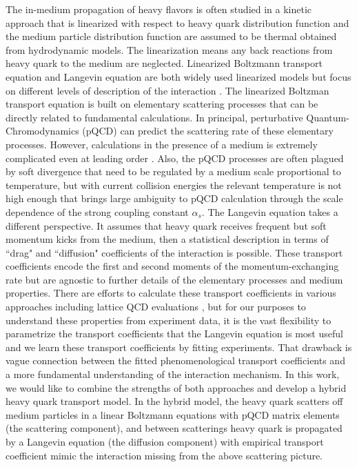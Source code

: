 \documentclass[aps, prc, reprint, amsmath, groupedaddress, nofootinbib]{revtex4-1}
\begin{document}
The in-medium propagation of heavy flavors is often studied in a kinetic approach that is linearized with respect to heavy quark distribution function and the medium particle distribution function are assumed to be thermal obtained from hydrodynamic models.
The linearization means any back reactions from heavy quark to the medium are neglected.
Linearized Boltzmann transport equation and Langevin equation are both widely used linearized models but focus on different levels of description of the interaction \cite{Auvinen:2009qm,Cao:2016gvr, Cao:2017hhk, PhysRevD.37.2484, Moore:2004tg}.
The linearized Boltzman transport equation is built on elementary scattering processes that can be directly related to fundamental calculations.
In principal, perturbative Quantum-Chromodynamics (pQCD) can predict the scattering rate of these elementary processes.
However, calculations in the presence of a medium is extremely complicated even at leading order \cite{Arnold:2002zm}.
Also, the pQCD processes are often plagued by soft divergence that need to be regulated by a medium scale proportional to temperature, but with current collision energies the relevant temperature is not high enough that brings large ambiguity to pQCD calculation through the scale dependence of the strong coupling constant $\alpha_s$.
The Langevin equation takes a different perspective. 
It assumes that heavy quark receives frequent but soft momentum kicks from the medium, then a statistical description in terms of ``drag" and ``diffusion" coefficients of the interaction is possible.
These transport coefficients encode the first and second moments of the momentum-exchanging rate but are agnostic to further details of the elementary processes and medium properties.
There are efforts to calculate these transport coefficients in various approaches including lattice QCD evaluations \cite{Moore:2004tg, Gossiaux:2008jv,He:2012df,Riek:2010fk,Ding:2012sp,Banerjee:2011ra}, but for our purposes to understand these properties from experiment data, it is the vast flexibility to parametrize the transport coefficients that the Langevin equation is most useful and we learn these transport coefficients by fitting experiments.
That drawback is vague connection between the fitted phenomenological transport coefficients and a more fundamental understanding of the interaction mechanism.
In this work, we would like to combine the strengths of both approaches
and develop a hybrid heavy quark transport model.
In the hybrid model, the heavy quark scatters off medium particles in a linear Boltzmann equations with pQCD matrix elements (the scattering component), and between scatterings heavy quark is propagated by a Langevin equation (the diffusion component) with empirical transport coefficient mimic the interaction missing from the above scattering picture.
\end{document}
